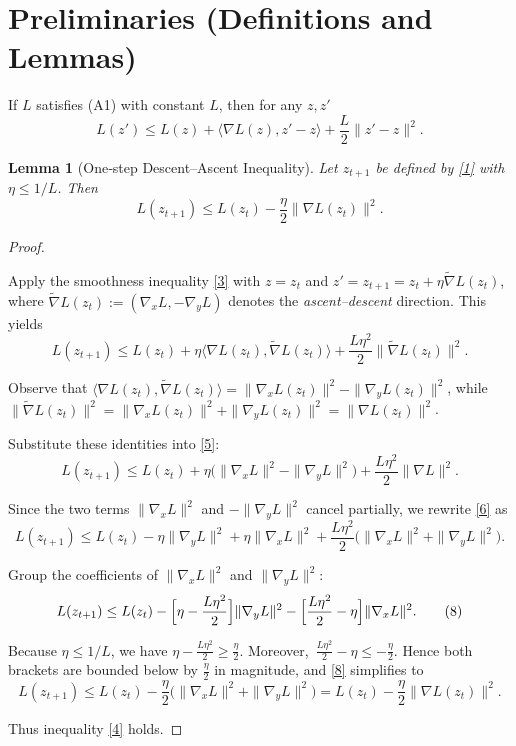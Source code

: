 \documentclass{article}
\newtheorem{lemma}{Lemma}
\begin{document}
\section*{Preliminaries (Definitions and Lemmas)}
\begin{definition}
If $L$ satisfies (A1) with constant $L$, then for any $z,z'$
\[
L(z')\le L(z)+\langle\nabla L(z),z'-z\rangle+\frac{L}{2}\|z'-z\|^{2}.
\tag{3}
\]
\end{definition}
\begin{lemma}[One‑step Descent–Ascent Inequality]\label{lem:descent}
Let $z_{t+1}$ be defined by \eqref{1} with $\eta\le1/L$. Then
\[
L(z_{t+1})\le L(z_t)-\frac{\eta}{2}\bigl\|\nabla L(z_t)\bigr\|^{2}.
\tag{4}
\]
\end{lemma}
\begin{proof}
\begin{enumerate}[label={[\arabic*]},leftmargin=*,itemsep=1pt]
\item Apply the smoothness inequality \eqref{3} with $z=z_t$ and $z'=z_{t+1}=z_t+ \eta\tilde{\nabla}L(z_t)$, where $\tilde{\nabla}L(z_t):=(\nabla_x L,-\nabla_y L)$ denotes the \emph{ascent–descent} direction. This yields
\[
L(z_{t+1})\le L(z_t)+\eta\langle\nabla L(z_t),\tilde{\nabla}L(z_t)\rangle+\frac{L\eta^{2}}{2}\|\tilde{\nabla}L(z_t)\|^{2}.
\tag{5}
\]
\item Observe that $\langle\nabla L(z_t),\tilde{\nabla}L(z_t)\rangle
= \|\nabla_x L(z_t)\|^{2}-\|\nabla_y L(z_t)\|^{2}$, while 
$\|\tilde{\nabla}L(z_t)\|^{2}= \|\nabla_x L(z_t)\|^{2}+\|\nabla_y L(z_t)\|^{2}= \|\nabla L(z_t)\|^{2}$.
\item Substitute these identities into \eqref{5}:
\[
L(z_{t+1})\le L(z_t)+\eta\bigl(\|\nabla_x L\|^{2}-\|\nabla_y L\|^{2}\bigr)
+\frac{L\eta^{2}}{2}\|\nabla L\|^{2}.
\tag{6}
\]
\item Since the two terms $\|\nabla_x L\|^{2}$ and $-\|\nabla_y L\|^{2}$ cancel partially, we rewrite \eqref{6} as
\[
L(z_{t+1})\le L(z_t)-\eta\|\nabla_y L\|^{2}
+\eta\|\nabla_x L\|^{2}
+\frac{L\eta^{2}}{2}\bigl(\|\nabla_x L\|^{2}+\|\nabla_y L\|^{2}\bigr).
\tag{7}
\]
\item Group the coefficients of $\|\nabla_x L\|^{2}$ and $\|\nabla_y L\|^{2}$:
\[
L(z_{t+1})\le L(z_t)-\Bigl[\eta-\frac{L\eta^{2}}{2}\Bigr]\|\nabla_y L\|^{2}
-\Bigl[\frac{L\eta^{2}}{2}-\eta\Bigr]\|\nabla_x L\|^{2}.
\tag{8}
\]
\item Because $\eta\le 1/L$, we have $\eta-\frac{L\eta^{2}}{2}\ge \frac{\eta}{2}$. Moreover,
$\,\frac{L\eta^{2}}{2}-\eta\le -\frac{\eta}{2}$. Hence both brackets are bounded below by $\frac{\eta}{2}$ in magnitude, and \eqref{8} simplifies to
\[
L(z_{t+1})\le L(z_t)-\frac{\eta}{2}\bigl(\|\nabla_x L\|^{2}+\|\nabla_y L\|^{2}\bigr)
= L(z_t)-\frac{\eta}{2}\|\nabla L(z_t)\|^{2}.
\tag{9}
\]
\end{enumerate}
Thus inequality \eqref{4} holds. \qedhere
\end{proof}
\end{document}
